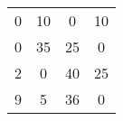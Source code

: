     \begin{tabular}{cccc}
    0       & 10      & 0       & 10 \\
    0       & 35      & 25      & 0 \\
    2       & 0       & 40      & 25 \\
    9       & 5       & 36      & 0 \bigstrut[b]\\
    \hline
    \hline
    \end{tabular}%
